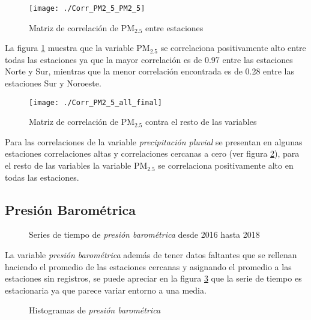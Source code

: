 \begin{figure}[H]
\centering
\texttt{[image: ./Corr\_PM2\_5\_PM2\_5]}
\caption{Matriz de correlación de PM$_{2.5}$ entre estaciones }
\label{corrPM25_2}
\end{figure}

La figura \ref{corrPM25_2} muestra que la variable PM$_{2.5}$ se correlaciona positivamente alto entre todas las estaciones ya que la mayor correlación es de 0.97 entre las estaciones Norte y Sur, mientras que la menor correlación encontrada es de 0.28 entre las estaciones Sur y Noroeste.

\begin{figure}[H]
\centering
\texttt{[image: ./Corr\_PM2\_5\_all\_final]}
\caption{Matriz de correlación de PM$_{2.5}$ contra el resto de las variables}
\label{corrPM2_5}
\end{figure}


Para las correlaciones de la variable {\em precipitación pluvial} se presentan en algunas estaciones correlaciones altas y correlaciones cercanas a cero (ver figura \ref{corrPM2_5}), para el resto de las variables la variable PM$_{2.5}$ se correlaciona positivamente alto en todas las estaciones.




\subsection{Presión Barométrica}
\begin{figure}[H]
\centering
{}
\caption{Series de tiempo de {\em presión barométrica} desde 2016 hasta 2018}
\label{seriePressure}
\end{figure}

La variable {\em presión barométrica} además de tener datos faltantes que se rellenan haciendo el promedio de las estaciones cercanas y asignando el promedio a las estaciones sin registros, se puede apreciar en la figura \ref{seriePressure} que la serie de tiempo es estacionaria ya que parece variar entorno a una media.

\begin{figure}[H]
\centering
{}
\caption{Histogramas de {\em presión barométrica}}
\label{histPressure}
\end{figure}

